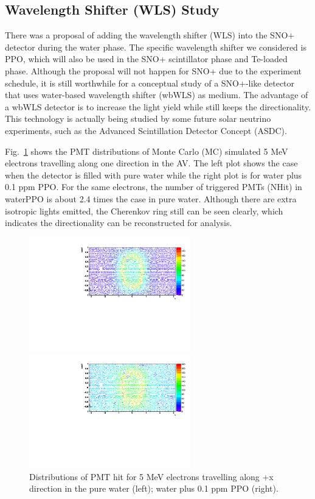 \documentclass[preprint,12pt]{elsarticle}
\numberwithin{equation}{section}
\begin{document}
\subsection{Wavelength Shifter (WLS) Study}
There was a proposal of adding the wavelength shifter (WLS) into the SNO+ detector during the water phase. The specific wavelength shifter we considered is PPO, which will also be used in the SNO+ scintillator phase and Te-loaded phase. Although the proposal will not happen for SNO+ due to the experiment schedule, it is still worthwhile for a conceptual study of a SNO+-like detector that uses water-based wavelength shifter (wbWLS) as medium. The advantage of a wbWLS detector is to increase the light yield while still keeps the directionality. This technology is actually being studied by some future solar neutrino experiments, such as the Advanced Scintillation Detector Concept (ASDC)\cite{asdc}.

Fig.~\ref{pmt_wls} shows the PMT distributions of Monte Carlo (MC) simulated 5 MeV electrons travelling along one direction in the AV. The left plot shows the case when the detector is filled with pure water while the right plot is for water plus 0.1 ppm PPO. For the same electrons, the number of triggered PMTs (NHit) in waterPPO is about 2.4 times the case in pure water. Although there are extra isotropic lights emitted, the Cherenkov ring still can be seen clearly, which indicates the directionality can be reconstructed for analysis.  

\begin{figure}[htbp]
	\centering
	\begin{minipage}[t]{0.48\textwidth}
		\centering
		\includegraphics[width=7cm]{PMT_5MeVElectronWater.pdf}
	\end{minipage}
	\begin{minipage}[t]{0.48\textwidth}
		\centering
		\includegraphics[width=7cm]{PMT_5MeVElectron0p1ppmPPO.pdf}
	\end{minipage}
	\caption{Distributions of PMT hit for 5 MeV electrons travelling along +x direction in the pure water (left); water plus 0.1 ppm PPO (right).}
	\label{pmt_wls}
\end{figure}
\end{document}
